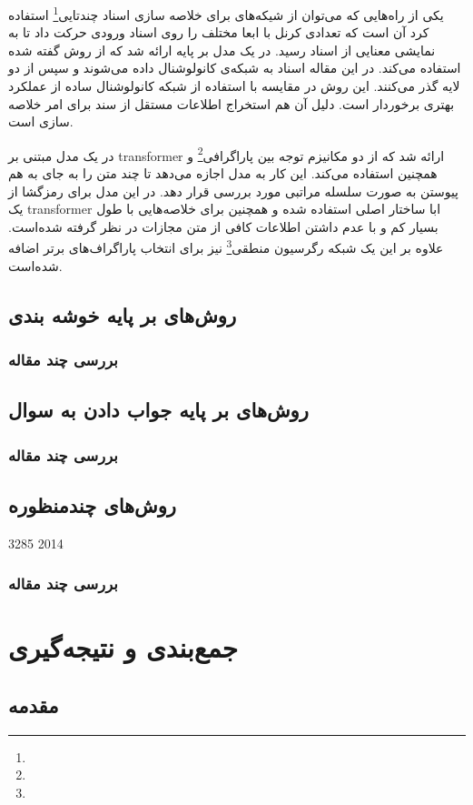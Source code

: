 \documentclass[12pt, a4paper, oneside]{report}
\begin{document}
یکی از راه‌هایی که می‌توان از شیکه‌های
برای خلاصه سازی اسناد چندتایی\footnote{}
استفاده کرد آن است که تعدادی کرنل با ابعا مختلف را روی اسناد ورودی حرکت داد تا به نمایشی معنایی از
اسناد رسید. در
\cite{ziqiang2015prior}
یک مدل بر پایه
ارائه شد که از روش گفته شده استفاده می‌کند. در این مقاله اسناد به شبکه‌ی کانولوشنال داده می‌شوند و سپس
از دو لایه
گذر می‌کنند. این روش در مقایسه با استفاده از شبکه کانولوشنال ساده از عملکرد بهتری برخوردار است. دلیل آن هم
استخراج اطلاعات مستقل از سند برای امر خلاصه سازی است.

در
\cite{liu2019hierarchical}
یک مدل مبتنی بر
transformer
ارائه شد که از دو مکانیزم توجه بین پاراگرافی\footnote{}
و همچنین
استفاده می‌کند. این کار به مدل اجازه می‌دهد تا چند متن را به جای به هم پیوستن
به صورت سلسله مراتبی مورد بررسی قرار دهد. در این مدل برای رمزگشا از یک
transformer
ابا ساختار اصلی استفاده شده و همچنین برای خلاصه‌هایی با طول بسیار کم و با عدم داشتن اطلاعات کافی از متن
مجازات در نظر گرفته شده‌است. علاوه بر این یک شبکه رگرسیون منطقی\footnote{}
نیز برای انتخاب پاراگراف‌های برتر اضافه شده‌است.

\section{روش‌های بر پایه خوشه بندی}

\subsection{بررسی چند مقاله}

\section{روش‌های بر پایه جواب دادن به سوال}

\subsection{بررسی چند مقاله}

\section{ روش‌های چندمنظوره }

\cite{kalchbrenner-etal-2014-convolutional} 3285 2014

\subsection{بررسی چند مقاله}


\chapter{جمع‌بندی و نتیجه‌گیری}
\pagebreak
\section{مقدمه}

\begin{latin}
    
\end{latin}
\end{document}
